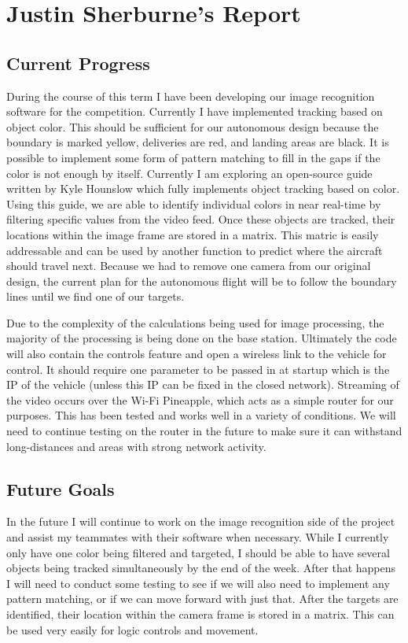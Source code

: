 \documentclass[onecolumn, draftclsnofoot,10pt, compsoc]{IEEEtran}
\begin{document}
\section{Justin Sherburne's Report}

\subsection{Current Progress}

During the course of this term I have been developing our image recognition software for the competition. Currently I have implemented tracking based on object color. This should be sufficient for our autonomous design because the boundary is marked yellow, deliveries are red, and landing areas are black. It is possible to implement some form of pattern matching to fill in the gaps if the color is not enough by itself. Currently I am exploring an open-source guide written by Kyle Hounslow which fully implements object tracking based on color. Using this guide, we are able to identify individual colors in near real-time by filtering specific values from the video feed. Once these objects are tracked, their locations within the image frame are stored in a matrix. This matric is easily addressable and can be used by another function to predict where the aircraft should travel next. Because we had to remove one camera from our original design, the current plan for the autonomous flight will be to follow the boundary lines until we find one of our targets. 

Due to the complexity of the calculations being used for image processing, the majority of the processing is being done on the base station. Ultimately the code will also contain the controls feature and open a wireless link to the vehicle for control. It should require one parameter to be passed in at startup which is the IP of the vehicle (unless this IP can be fixed in the closed network). Streaming of the video occurs over the Wi-Fi Pineapple, which acts as a simple router for our purposes. This has been tested and works well in a variety of conditions. We will need to continue testing on the router in the future to make sure it can withstand long-distances and areas with strong network activity.


\subsection{Future Goals}

In the future I will continue to work on the image recognition side of the project and assist my teammates with their software when necessary. While I currently only have one color being filtered and targeted, I should be able to have several objects being tracked simultaneously by the end of the week. After that happens I will need to conduct some testing to see if we will also need to implement any pattern matching, or if we can move forward with just that. After the targets are identified, their location within the camera frame is stored in a matrix. This can be used very easily for logic controls and movement. 
\end{document}
